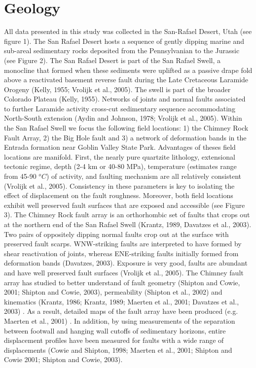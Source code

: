 \documentclass[12pt,a4paper]{article}
\begin{document}
\section{Geology}

All data presented in this study was collected in the San-Rafael Desert, Utah (see figure 1). The San Rafael Desert hosts a sequence of gently dipping marine and sub-areal sedimentary rocks deposited from the Pennsylvanian to the Jurassic (see Figure 2). 
The San Rafael Desert is part of the San Rafael Swell, a monocline that formed when these sediments were uplifted as a passive drape fold above a reactivated basement reverse fault during the Late Cretaceous Laramide Orogeny (Kelly, 1955; Vrolijk et al., 2005). The swell is part of the broader Colorado Plateau (Kelly, 1955). Networks of joints and normal faults associated to further Laramide activity cross-cut sedimentary sequence accommodating North-South extension (Aydin and Johnson, 1978; Vrolijk et al., 2005). Within the San Rafael Swell we focus the following field locations: 1) the Chimney Rock Fault Array, 2) the Big Hole fault and 3) a network of deformation bands in the Entrada formation near Goblin Valley State Park.  Advantages of theses field locations are manifold. First, the nearly pure quartzite lithology, extensional tectonic regime, depth (2-4 km or 40-80 MPa), temperature (estimates range from 45-90 $^oC$) of activity, and faulting mechanism are all relatively consistent (Vrolijk et al., 2005). Consistency in these parameters is key to isolating the effect of displacement on the fault roughness. Moreover, both field locations exhibit well preserved fault surfaces that are exposed and accessible (see Figure 3). 
The Chimney Rock fault array is an orthorhombic set of faults that crops out at the northern end of the San Rafael Swell (Krantz, 1989, Davatzes et al., 2003). Two pairs of oppositely dipping normal faults crop out at the surface with preserved fault scarps. WNW-striking faults are interpreted to have formed by shear reactivation of joints, whereas ENE-striking faults initially formed from deformation bands (Davatzes, 2003). Exposure is very good, faults are abundant and have well preserved fault surfaces (Vrolijk et al., 2005). The Chimney fault array has studied to better understand of fault geometry (Shipton and Cowie, 2001; Shipton and Cowie, 2003), permeability (Shipton et al., 2002) and kinematics (Krantz, 1986; Krantz, 1989; Maerten et al., 2001; Davatzes et al., 2003) . As a result, detailed maps of the fault array have been produced (e.g. Maerten et al., 2001) . In addition, by using measurements of the separation between footwall and hanging wall cutoffs of sedimentary horizons, entire displacement profiles have been measured for faults with a wide range of displacements (Cowie and Shipton, 1998; Maerten et al., 2001; Shipton and Cowie 2001; Shipton and Cowie, 2003). 
\end{document}

